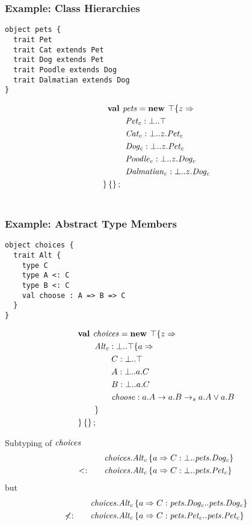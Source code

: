 \documentclass{beamer}
\begin{document}
\begin{frame}[fragile]
\frametitle{Example: Class Hierarchies}
\begin{verbatim}
object pets {
  trait Pet
  trait Cat extends Pet
  trait Dog extends Pet
  trait Poodle extends Dog
  trait Dalmatian extends Dog
}
\end{verbatim}
\begin{align*}
\textbf{val }&\mathit{pets} = \textbf{new }\top \{z \Rightarrow \\
&\ \mathit{Pet_c} : \bot..\top\\
&\ \mathit{Cat_c} : \bot..z.{\mathit{Pet_c}}\\
&\ \mathit{Dog_c} : \bot..z.{\mathit{Pet_c}}\\
&\ \mathit{Poodle_c} : \bot..z.{\mathit{Dog_c}}\\
&\ \mathit{Dalmatian_c} : \bot..z.{\mathit{Dog_c}}\\
 \} \left\{\right\} ;\;\\&
\end{align*}
\end{frame}

\begin{frame}[fragile]
\frametitle{Example: Abstract Type Members}
\begin{verbatim}
object choices {
  trait Alt {
    type C
    type A <: C
    type B <: C
    val choose : A => B => C
  }
}
\end{verbatim}
\begin{align*}
&\textbf{val }\mathit{choices} = \textbf{new }\top \{z \Rightarrow \\
&\quad\quad\mathit{Alt_c} : \bot..\top \{a \Rightarrow \\
&\quad\quad\quad\quad C : \bot..\top\\
&\quad\quad\quad\quad A : \bot..a.C\\
&\quad\quad\quad\quad B : \bot..a.C\\
&\quad\quad\quad\quad\mathit{choose} : a.A \rightarrow a.B\rightarrow_sa.A \vee a.B\\
&\quad\quad \}\\
& \}\left\{\right\} ;\;
\end{align*}
\end{frame}

\begin{frame}[fragile]{Subtyping of $\mathit{choices}$}
\begin{align*}
&{\mathit{choices.Alt_c} \left\{a \Rightarrow C : \bot..\mathit{pets.Dog_c} \right\}}\\
<:\quad\quad&{\mathit{choices.Alt_c} \left\{a \Rightarrow C : \bot..\mathit{pets.Pet_c} \right\}}
\end{align*}
but
\begin{align*}
&{\mathit{choices.Alt_c} \left\{a \Rightarrow C : \mathit{pets.Dog_c}..\mathit{pets.Dog_c} \right\}}\\
\not<:\quad\quad&{\mathit{choices.Alt_c} \left\{a \Rightarrow C : \mathit{pets.Pet_c}..\mathit{pets.Pet_c} \right\}}
\end{align*}
\end{frame}
\end{document}
